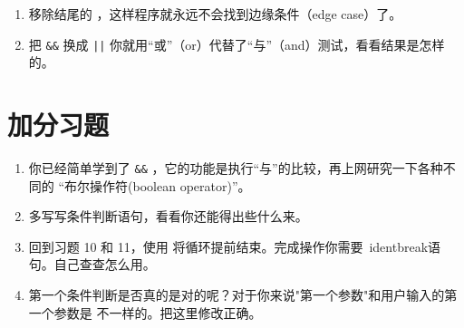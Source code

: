 \begin{enumerate}
\item 移除结尾的 ，这样程序就永远不会找到边缘条件（edge case）了。
\item 把 \verb|&&| 换成 \verb,||, 你就用“或”（or）代替了“与”（and）测试，看看结果是怎样的。
\end{enumerate}

\section{加分习题}

\begin{enumerate}
\item 你已经简单学到了 \verb|&&| ，它的功能是执行“与”的比较，再上网研究一下各种不同的
“布尔操作符(boolean operator)”。
\item 多写写条件判断语句，看看你还能得出些什么来。
\item 回到习题 10 和 11，使用 将循环提前结束。完成操作你需要\
ident{break}语句。自己查查怎么用。
\item 第一个条件判断是否真的是对的呢？对于你来说"第一个参数"和用户输入的第一个参数是
不一样的。把这里修改正确。
\end{enumerate}

